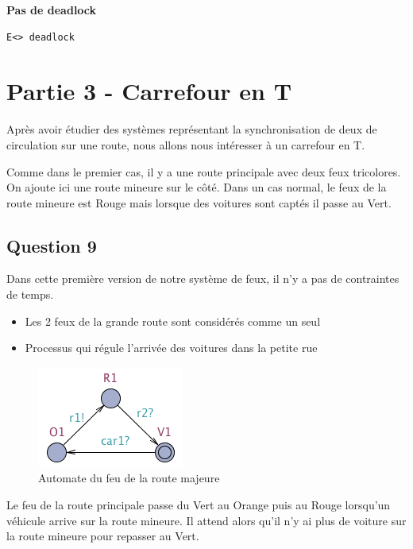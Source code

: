 \documentclass[11pt]{article}
\begin{document}

\textbf{Pas de deadlock}
\begin{verbatim}
E<> deadlock
\end{verbatim}

\section{Partie 3 - Carrefour en T}
Après avoir étudier des systèmes représentant la synchronisation de deux de circulation sur une route, nous allons nous intéresser à un carrefour en T.

Comme dans le premier cas, il y a une route principale avec deux feux tricolores. On ajoute ici une route mineure sur le côté. Dans un cas normal, le feux de la route mineure est Rouge mais lorsque des voitures sont captés il passe au Vert.

\subsection{Question 9}

Dans cette première version de notre système de feux, il n'y a pas de contraintes de temps.

\begin{itemize}
	\item Les 2 feux de la grande route sont considérés comme un seul
	\item Processus qui régule l'arrivée des voitures dans la petite rue
\end{itemize}

\begin{figure}[H]
	\centering
	\includegraphics{ressources/part3/Q9-1.png}
	\caption{Automate du feu de la route majeure}
\end{figure}

Le feu de la route principale passe du Vert au Orange puis au Rouge lorsqu'un véhicule arrive sur la route mineure. Il attend alors qu'il n'y ai plus de voiture sur la route mineure pour repasser au Vert.
\end{document}
